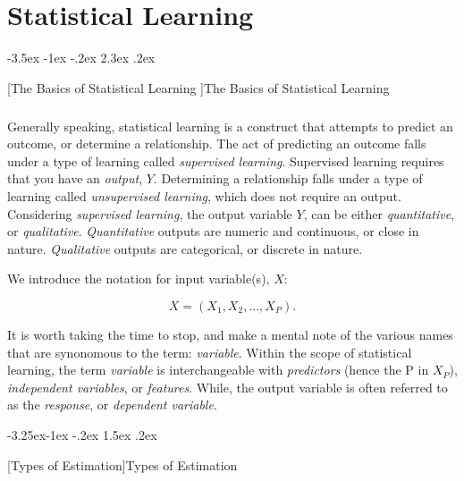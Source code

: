 \documentclass[titlepage, 12pt, twoside]{book}
\makeatletter
\renewcommand\section{\@startsection {section}{1}{\z@}%
	{-3.5ex \@plus -1ex \@minus -.2ex}%
	{2.3ex \@plus.2ex}%
	{\normalfont\Large\bfseries\raggedright}}
\renewcommand\subsection{\@startsection{subsection}{2}{\z@}%
	{-3.25ex\@plus -1ex \@minus -.2ex}%
	{1.5ex \@plus .2ex}%
	{\normalfont\large\bfseries\raggedright}}
\makeatother
\begin{document}
	\color{astral}\chapter{Statistical Learning}

	 \section[The Basics of Statistical Learning ]{The Basics of Statistical Learning} %

	
\color{black} 	\paragraph{} Generally speaking, statistical learning is a construct that attempts to predict an outcome, or determine a relationship. The act of predicting an outcome falls under a type of learning called \textit{supervised learning}. Supervised learning requires that you have an \textit{output}, $Y$. Determining a relationship falls under a type of learning called \textit{unsupervised learning}, which does not require an output. Considering \textit{supervised learning}, the output variable $Y$, can be either \textit{quantitative}, or \textit{qualitative}. \textit{Quantitative} outputs are numeric and continuous, or close in nature. \textit{Qualitative} outputs are categorical, or discrete in nature. 

We introduce the notation for input variable(s), $X$: 

\vspace{1mm}
\begin{equation}	
	X = (X_1, X_2, ... , X_P).    
 \end{equation}
\vspace{-5mm}

It is worth taking the time to stop, and make a mental note of the various names that are synonomous to the term: \textit{variable}. Within the scope of statistical learning, the term \textit{variable} is interchangeable with \textit{predictors} (hence the P in $X_P$), \textit{independent variables}, or \textit{features}. While, the output variable is often referred to as the \textit{response}, or \textit{dependent variable}. 

\color{astral}\subsection[Types of Estimation]{Types of Estimation}
		
\end{document}

